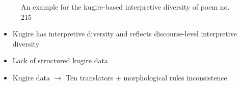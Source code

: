 \begin{figure}[H]\centering

\setcounter{figure}{0}
\caption{An example for the kugire-based interpretive diversity of poem no.\,215}
\end{figure}

{\large
\begin{itemize}
\item Kugire has interpretive diversity and reflects discourse-level interpretive diversity
\item Lack of structured kugire data
\item Kugire data $\rightarrow$ Ten translators + morphological rules inconsistence
\end{itemize}
}
